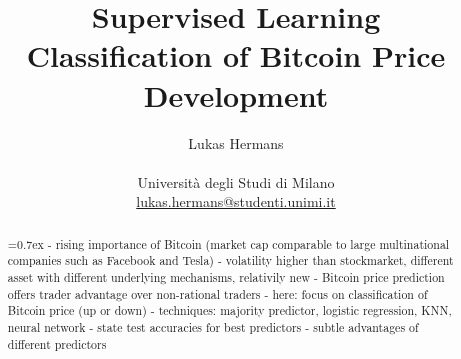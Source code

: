 \title{\large Supervised Learning \\ \LARGE
 Classification of Bitcoin Price Development}
\author{Lukas Hermans\\ \\
{Università degli Studi di Milano} \\
\href{mailto:lukas.hermans@studenti.unimi.it}
{lukas.hermans@studenti.unimi.it}}

\maketitle

\begin{abstract} 
\noindent
{}\font=0.7ex%
- rising importance of Bitcoin (market cap comparable to large multinational companies such as Facebook and Tesla)
- volatility higher than stockmarket, different asset with different underlying mechanisms, relativily new
- Bitcoin price prediction offers trader advantage over non-rational traders
- here: focus on classification of Bitcoin price (up or down)
- techniques: majority predictor, logistic regression, KNN, neural network
- state test accuracies for best predictors
- subtle advantages of different predictors 
\end{abstract}
